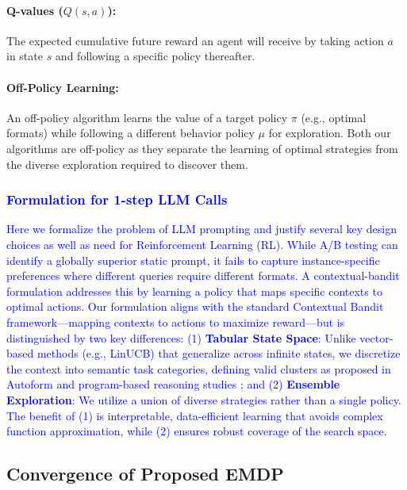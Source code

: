 {\paragraph{Q-values ($Q(s, a)$):} The expected cumulative future reward an agent will receive by taking action $a$ in state $s$ and following a specific policy thereafter.
\paragraph{Off-Policy Learning:} An off-policy algorithm learns the value of a target policy $\pi$ (e.g., optimal formats) while following a different behavior policy $\mu$ for exploration. Both our algorithms are off-policy as they separate the learning of optimal strategies from the diverse exploration required to discover them.}


\subsubsection{\textcolor{blue}{Formulation for 1-step LLM Calls}}
\label{sec:formulation_1step}


\textcolor{blue}{
Here we formalize the problem of LLM prompting and justify several key design choices as well as need for Reinforcement Learning (RL). While A/B testing can identify a globally superior static prompt, it fails to capture instance-specific preferences where different queries require different formats. A contextual-bandit formulation addresses this by learning a policy that maps specific contexts to optimal actions. Our formulation aligns with the standard Contextual Bandit framework—mapping contexts to actions to maximize reward—but is distinguished by two key differences: (1) \textbf{Tabular State Space}: Unlike vector-based methods (e.g., LinUCB) that generalize across infinite states, we discretize the context into semantic task categories, defining valid clusters as proposed in Autoform \cite{chen-etal-2024-beyond-natural} and program-based reasoning studies \cite{tian2024can}; and (2) \textbf{Ensemble Exploration}: We utilize a union of diverse strategies rather than a single policy. The benefit of (1) is interpretable, data-efficient learning that avoids complex function approximation, while (2) ensures robust coverage of the search space.
}

\subsection{Convergence of Proposed EMDP}\label{appendix_sec_proof}

